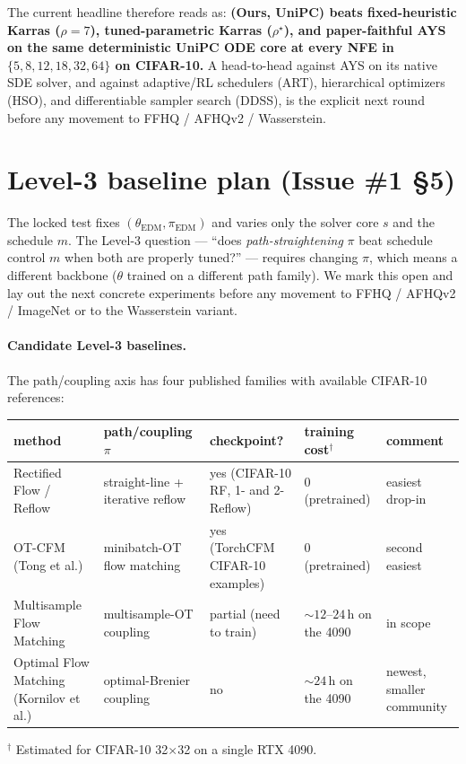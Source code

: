 \documentclass[11pt]{article}
\begin{document}
The current headline therefore reads as: \textbf{(Ours, UniPC) beats
fixed-heuristic Karras (\(\rho{=}7\)), tuned-parametric Karras
(\(\rho^\star\)), and paper-faithful AYS on the same deterministic
UniPC ODE core at every NFE in \(\{5,8,12,18,32,64\}\) on CIFAR-10.}
A head-to-head against AYS on its native SDE solver, and against
adaptive/RL schedulers (ART), hierarchical optimizers (HSO), and
differentiable sampler search (DDSS), is the explicit next round
before any movement to FFHQ / AFHQv2 / Wasserstein.

\section{Level-3 baseline plan (Issue \#1 \S5)}
\label{sec:level3-plan}

The locked test fixes \((\theta_{\mathrm{EDM}}, \pi_{\mathrm{EDM}})\)
and varies only the solver core \(s\) and the schedule \(m\). The Level-3
question --- ``does \emph{path-straightening} \(\pi\) beat schedule
control \(m\) when both are properly tuned?'' --- requires changing
\(\pi\), which means a different backbone (\(\theta\) trained on a
different path family). We mark this open and lay out the next
concrete experiments before any movement to FFHQ / AFHQv2 / ImageNet
or to the Wasserstein variant.

\paragraph{Candidate Level-3 baselines.} The path/coupling axis has
four published families with available CIFAR-10 references:

\begin{center}
\scriptsize
\begin{tabular}{l l l l l}
\toprule
method & path/coupling \(\pi\) & checkpoint? & training cost\(^\dagger\) & comment \\
\midrule
Rectified Flow / Reflow & straight-line + iterative reflow & yes (CIFAR-10 RF, 1- and 2-Reflow) & 0 (pretrained) & easiest drop-in \\
OT-CFM (Tong et al.) & minibatch-OT flow matching & yes (TorchCFM CIFAR-10 examples) & 0 (pretrained) & second easiest \\
Multisample Flow Matching & multisample-OT coupling & partial (need to train) & \(\sim 12\)--\(24\)\,h on the 4090 & in scope \\
Optimal Flow Matching (Kornilov et al.) & optimal-Brenier coupling & no & \(\sim 24\)\,h on the 4090 & newest, smaller community \\
\bottomrule
\end{tabular}
\end{center}
\(^\dagger\) Estimated for CIFAR-10 32\(\times\)32 on a single RTX 4090.
\end{document}
